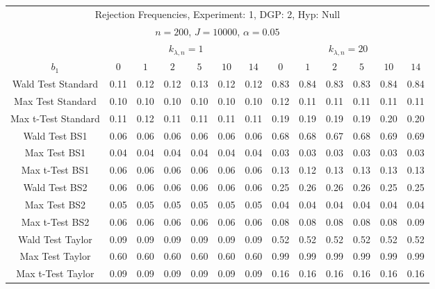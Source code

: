  \begin{table}[H] 
 \singlespacing 
 \tiny 
 \centering 
\begin{tabular}{c|cccccc|cccccc} 
\multicolumn{13}{c}{ Rejection Frequencies, Experiment: 1, DGP: 2, Hyp: Null } \\ 
\multicolumn{13}{c}{ $n=200$, $J=10000$, $\alpha = 0.05$ } \\ 
 \multicolumn{1}{c}{} & \multicolumn{6}{c}{ $k_{\lambda,n}=1$ } & \multicolumn{6}{c}{ $k_{\lambda,n}=20$ } \\ 
 \hline 
 $b_{1}$ & $0$ & $1$ & $2$ & $5$ & $10$ & $14$ & $0$ & $1$ & $2$ & $5$ & $10$ & $14$   \\ 
 \hline 
 \hline 
 Wald Test Standard &  0.11 &  0.12 &  0.12 &  0.13 &  0.12 &  0.12 &  0.83 &  0.84 &  0.83 &  0.83 &  0.84 &  0.84 \\ 
 Max Test Standard &  0.10 &  0.10 &  0.10 &  0.10 &  0.10 &  0.10 &  0.12 &  0.11 &  0.11 &  0.11 &  0.11 &  0.11 \\ 
 Max t-Test Standard &  0.11 &  0.12 &  0.11 &  0.11 &  0.11 &  0.11 &  0.19 &  0.19 &  0.19 &  0.19 &  0.20 &  0.20 \\ 
 \hline 
 Wald Test BS1 &  0.06 &  0.06 &  0.06 &  0.06 &  0.06 &  0.06 &  0.68 &  0.68 &  0.67 &  0.68 &  0.69 &  0.69 \\ 
 Max Test BS1 &  0.04 &  0.04 &  0.04 &  0.04 &  0.04 &  0.04 &  0.03 &  0.03 &  0.03 &  0.03 &  0.03 &  0.03 \\ 
 Max t-Test BS1 &  0.06 &  0.06 &  0.06 &  0.06 &  0.06 &  0.06 &  0.13 &  0.12 &  0.13 &  0.13 &  0.13 &  0.13 \\ 
 \hline 
 Wald Test BS2 &  0.06 &  0.06 &  0.06 &  0.06 &  0.06 &  0.06 &  0.25 &  0.26 &  0.26 &  0.26 &  0.25 &  0.25 \\ 
 Max Test BS2 &  0.05 &  0.05 &  0.05 &  0.05 &  0.05 &  0.05 &  0.04 &  0.04 &  0.04 &  0.04 &  0.04 &  0.04 \\ 
 Max t-Test BS2 &  0.06 &  0.06 &  0.06 &  0.06 &  0.06 &  0.06 &  0.08 &  0.08 &  0.08 &  0.08 &  0.08 &  0.09 \\ 
 \hline 
 Wald Test Taylor &  0.09 &  0.09 &  0.09 &  0.09 &  0.09 &  0.09 &  0.52 &  0.52 &  0.52 &  0.52 &  0.52 &  0.52 \\ 
 Max Test Taylor &  0.60 &  0.60 &  0.60 &  0.60 &  0.60 &  0.60 &  0.99 &  0.99 &  0.99 &  0.99 &  0.99 &  0.99 \\ 
 Max t-Test Taylor &  0.09 &  0.09 &  0.09 &  0.09 &  0.09 &  0.09 &  0.16 &  0.16 &  0.16 &  0.16 &  0.16 &  0.16 \\ 
 \hline 
\end{tabular}
 \end{table}
